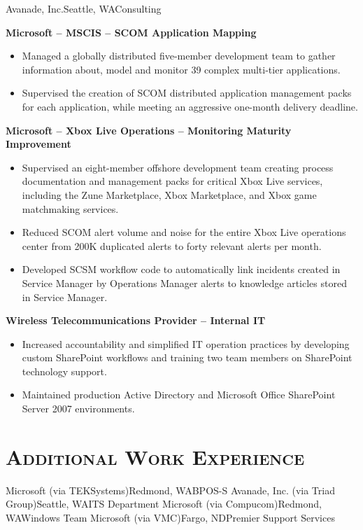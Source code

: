 \documentclass[11pt,letter,roman]{moderncv}
\begin{document}
{Avanade, Inc.}{Seattle, WA}{Consulting}{%
  \textbf{Microsoft -- MSCIS -- SCOM Application Mapping}
  \begin{itemize}
    \item Managed a globally distributed five-member development team to
      gather information about, model and monitor 39 complex multi-tier
      applications.
    \item Supervised the creation of SCOM distributed application management
      packs for each application, while meeting an aggressive
      one-month delivery deadline.
  \end{itemize}
  \textbf{Microsoft -- Xbox Live Operations -- Monitoring Maturity Improvement}
  \begin{itemize}
    \item Supervised an eight-member offshore development team creating
      process documentation and management packs for critical Xbox Live
      services, including the Zune Marketplace, Xbox Marketplace, and Xbox
      game matchmaking services.
    \item Reduced SCOM alert volume and noise for the entire Xbox Live
      operations center from 200K duplicated alerts to forty relevant alerts
      per month.
    \item Developed SCSM workflow code to automatically link incidents created
      in Service Manager by Operations Manager alerts to knowledge articles
      stored in Service Manager.
  \end{itemize}
  \textbf{Wireless Telecommunications Provider -- Internal IT}
  \begin{itemize}
    \item Increased accountability and simplified IT operation practices by
      developing custom SharePoint workflows and training two team members
      on SharePoint technology support.
    \item Maintained production Active Directory and Microsoft Office
      SharePoint Server 2007 environments.
  \end{itemize}
}

\section{\textsc{Additional Work Experience}}
{Microsoft (via TEKSystems)}{Redmond, WA}{BPOS-S}{}
{Avanade, Inc. (via Triad Group)}{Seattle, WA}{ITS Department}{}
{Microsoft (via Compucom)}{Redmond, WA}{Windows Team}{}
{Microsoft (via VMC)}{Fargo, ND}{Premier Support Services}{}
\end{document}
